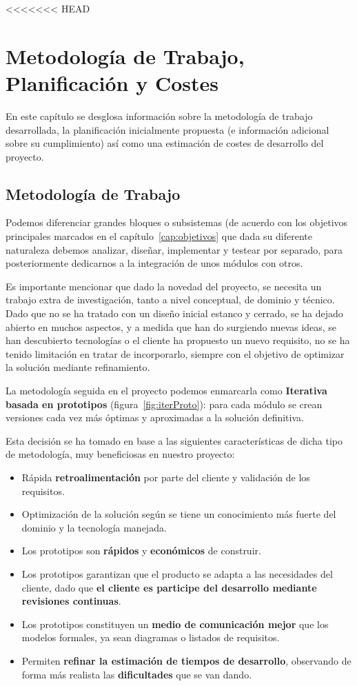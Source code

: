 <<<<<<< HEAD
\chapter{Metodología de Trabajo, Planificación y Costes}

En este capítulo se desglosa información sobre la metodología de trabajo desarrollada, la planificación inicialmente propuesta (e información adicional sobre su cumplimiento) así como una estimación de costes de desarrollo del proyecto.


\section{Metodología de Trabajo}


Podemos diferenciar grandes bloques o subsistemas (de acuerdo con los objetivos principales marcados en el capítulo~\ref{cap:objetivos} que dada su diferente naturaleza debemos analizar, diseñar, implementar y testear por separado, para posteriormente dedicarnos a la integración de unos módulos con otros.

Es importante mencionar que dado la novedad del proyecto, se necesita un trabajo extra de investigación, tanto a nivel conceptual, de dominio y técnico. Dado que no se ha tratado con un diseño inicial estanco y cerrado, se ha dejado abierto en muchos aspectos, y a medida que han do surgiendo nuevas ideas, se han descubierto tecnologías o el cliente ha propuesto un nuevo requisito, no se ha tenido limitación en tratar de incorporarlo, siempre con el objetivo de  optimizar la solución mediante refinamiento.

La metodología seguida en el proyecto podemos enmarcarla como \textbf{Iterativa basada en prototipos} (figura~\ref{fig:iterProto}): para cada módulo se crean versiones cada vez más óptimas y aproximadas a la solución definitiva.

Esta decisión se ha tomado en base a las siguientes características de dicha tipo de metodología, muy beneficiosas en nuestro proyecto:

\begin{itemize}
	\item Rápida \textbf{retroalimentación} por parte del cliente y validación de los requisitos. 
	\item Optimización de la solución según se tiene un conocimiento más fuerte del dominio y la tecnología manejada.
	\item Los prototipos son \textbf{rápidos} y \textbf{económicos} de construir.
	\item Los prototipos garantizan que el producto se adapta a las necesidades del cliente, dado que \textbf{el cliente es participe del desarrollo mediante revisiones continuas}. 
	\item Los prototipos constituyen un \textbf{medio de comunicación mejor} que los modelos formales, ya sean diagramas o listados de requisitos. 
	\item Permiten \textbf{refinar la estimación de tiempos de desarrollo}, observando de forma más realista las \textbf{dificultades} que se van dando.  	
\end{itemize}


